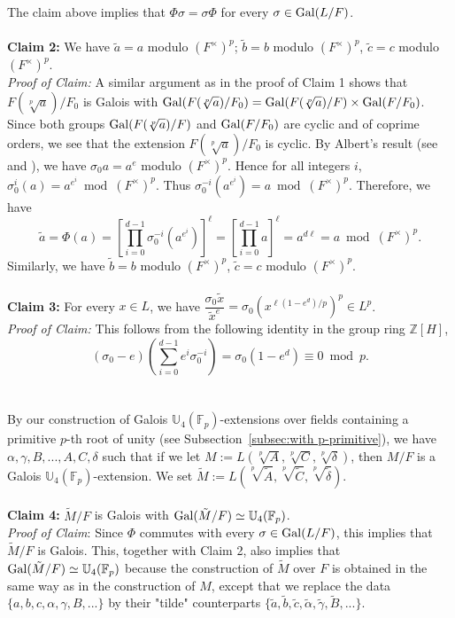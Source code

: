 \documentclass[12pt,leqno]{amsart}
\theoremstyle{plain}
\theoremstyle{definition}
\newcommand{\F}{{\mathbb F}}
\newcommand{\U}{{\mathbb U}}
\newcommand{\Z}{{\mathbb Z}}
\begin{document}
The claim above implies that $\Phi\sigma=\sigma\Phi$ for every $\sigma\in {\rm Gal}(L/F)$. 
\\
\\
{\bf Claim 2:} We have $\tilde{a}=a$ modulo $(F^\times)^p$; $\tilde{b}=b$ modulo $(F^\times)^p$, $\tilde{c}=c$ modulo $(F^\times)^p$.\\
{\it Proof of Claim:} A similar argument as in the proof of Claim 1 shows that $F(\sqrt[p]{a})/F_0$ is Galois with ${\rm Gal}(F(\sqrt[p]{a})/F_0)={\rm Gal}(F(\sqrt[p]{a})/F)\times {\rm Gal}(F/F_0)$. Since both groups ${\rm Gal}(F(\sqrt[p]{a})/F)$ and ${\rm Gal}(F/F_0)$ are cyclic and of coprime orders, we see that the extension $F(\sqrt[p]{a})/F_0$ is cyclic. By Albert's result (see \cite[pages 209-211]{Alb} and \cite[Section 5]{Wat}), we have $\sigma_0 a =a^e $ modulo $(F^\times)^p$. Hence for all integers $i$, $\sigma_0^i(a)=a^{e^i}\bmod (F^\times)^p$. Thus $\sigma_0^{-i}(a^{e^i})=a\bmod (F^\times)^p$.
Therefore, we have
\[
\tilde{a}=\Phi(a)=\left[ \prod_{i=0}^{d-1}\sigma_0^{-i}(a^{e^i})\right]^\ell= \left[\prod_{i=0}^{d-1} a \right]^\ell= a^{d\ell}=a \bmod (F^\times)^p.
\]
Similarly, we have $\tilde{b}=b$ modulo $(F^\times)^p$, $\tilde{c}=c$ modulo $(F^\times)^p$.
\\
\\
{\bf Claim 3:} For every $x\in L$, we have $\dfrac{\sigma_0\tilde{x}}{\tilde{x}^e}= \sigma_0(x^{\ell(1-e^d)/p})^p \in L^p$.\\
{\it Proof of Claim:} This follows from the following identity in the group ring $\Z[H]$,
\[
(\sigma_0-e)(\sum_{i=0}^{d-1}e^i\sigma_0^{-i})= \sigma_0(1-e^d)\equiv 0\bmod p.
\]
\\
\\
By our construction of Galois $\U_4(\F_p)$-extensions  over fields containing a primitive $p$-th root of unity (see Subsection~\ref{subsec:with p-primitive}), we have $\alpha,\gamma,B,...,A,C,\delta$ such that if we let 
$M:= L(\sqrt[p]{A},\sqrt[p]{C},\sqrt[p]{\delta})$, then $M/F$ is a Galois $\U_4(\F_p)$-extension. 
We set $\tilde{M}:=L(\sqrt[p]{\tilde{A}},\sqrt[p]{\tilde{C}},\sqrt[p]{\tilde{\delta}})$.
\\
\\
{\bf Claim 4:} $\tilde{M}/F$ is Galois with ${\rm Gal}(\tilde{M}/F)\simeq \U_4(\F_p)$.\\
{\it Proof of Claim}: Since $\Phi$ commutes with every $\sigma\in {\rm Gal}(L/F)$, this implies that $\tilde{M}/F$ is Galois. 
This, together with Claim 2, also implies that ${\rm Gal}(\tilde{M}/F)\simeq \U_4(\F_p)$  because the construction of $\tilde{M}$ over $F$ is obtained in the same way as in the construction of $M$, except that we replace the data $\{a,b,c, \alpha,\gamma, B,...\}$ by their "tilde" counterparts $\{\tilde{a},\tilde{b},\tilde{c}, \tilde{\alpha},\tilde{\gamma},\tilde{B},...\}$.
\end{document}
